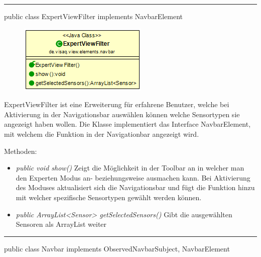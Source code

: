 

\rule{\textwidth}{0.4pt}
public class ExpertViewFilter implements NavbarElement

\begin{minipage}{0.3\textwidth}
    \begin{figure}[H]
        \includegraphics[scale = 0.6]{media/frontend/view/de.view.elements.navbar/ExpertviewFilterClass.png}
    \end{figure}
    \end{minipage} \hfill
    \begin{minipage}{0.6\textwidth}
ExpertViewFilter ist eine Erweiterung für erfahrene Benutzer, welche bei Aktivierung in der Navigationsbar auswählen können welche Sensortypen sie angezeigt haben wollen. Die Klasse implementiert das Interface NavbarElement, mit welchem die Funktion in der Navigationbar angezeigt wird.
\end{minipage}

Methoden:
\begin{itemize}
    \item \emph{public void show()} Zeigt die Möglichkeit in der Toolbar an in welcher man den Experten Modus an- beziehungsweise ausmachen kann. Bei Aktivierung des Moduses aktualisiert sich die Navigationsbar und fügt die Funktion hinzu mit welcher spezifische Sensortypen gewählt werden können.
    \item \emph{public ArrayList<Sensor> getSelectedSensors()} Gibt die ausgewählten Sensoren als ArrayList weiter
\end{itemize}
\clearpage %
\rule{\textwidth}{0.4pt}
public class Navbar implements ObservedNavbarSubject, NavbarElement

